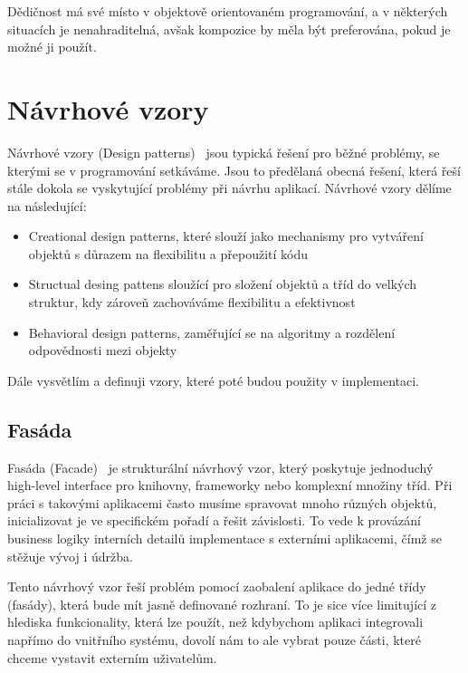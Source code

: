 Dědičnost má své místo v objektově orientovaném programování, a v některých situacích je nenahraditelná, avšak kompozice by měla být preferována, pokud je možné ji použít.

\section{Návrhové vzory}

Návrhové vzory (Design patterns)~\cite{DesignPatterns} jsou typická řešení pro běžné problémy, se kterými se v programování setkáváme. Jsou to předělaná obecná řešení, která řeší stále dokola se vyskytující problémy při návrhu aplikací. Návrhové vzory dělíme na následující:

\begin{itemize}
    \item Creational design patterns, které slouží jako mechanismy pro vytváření objektů s důrazem na flexibilitu a přepoužití kódu
    \item Structual desing pattens sloužící pro složení objektů a tříd do velkých struktur, kdy zároveň zachováváme flexibilitu a efektivnost
    \item Behavioral design patterns, zaměřující se na algoritmy a rozdělení odpovědnosti mezi objekty
\end{itemize}

Dále vysvětlím a definuji vzory, které poté budou použity v implementaci.

\subsection{Fasáda}
\label{facade}

Fasáda (Facade)~\cite{Fasade} je strukturální návrhový vzor, který poskytuje jednoduchý high-level interface pro knihovny, frameworky nebo komplexní množiny tříd. Při práci s takovými aplikacemi často musíme spravovat mnoho různých objektů, inicializovat je ve specifickém pořadí a řešit závislosti. To vede k provázání business logiky interních detailů implementace s externími aplikacemi, čímž se stěžuje vývoj i údržba.

Tento návrhový vzor řeší problém pomocí zaobalení aplikace do jedné třídy (fasády), která bude mít jasně definované rozhraní. To je sice více limitující z hlediska funkcionality, která lze použít, než kdybychom aplikaci integrovali napřímo do vnitřního systému, dovolí nám to ale vybrat pouze části, které chceme vystavit externím uživatelům.

